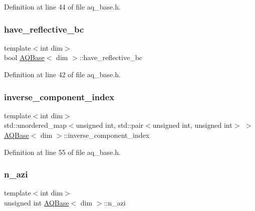 Definition at line 44 of file aq\+\_\+base.\+h.

\mbox{\label{class_a_q_base_a8afa1e0da5bbb4846e495178e165b5b5}} 
\subsubsection{\texorpdfstring{have\+\_\+reflective\+\_\+bc}{have\_reflective\_bc}}
{\footnotesize\ttfamily template$<$int dim$>$ \\
bool \hyperlink{class_a_q_base}{A\+Q\+Base}$<$ dim $>$\+::have\+\_\+reflective\+\_\+bc\hspace{0.3cm}{\ttfamily [protected]}}



Definition at line 42 of file aq\+\_\+base.\+h.

\mbox{\label{class_a_q_base_a657640cc73cef6130bdf5b325dd0fd11}} 
\subsubsection{\texorpdfstring{inverse\+\_\+component\+\_\+index}{inverse\_component\_index}}
{\footnotesize\ttfamily template$<$int dim$>$ \\
std\+::unordered\+\_\+map$<$unsigned int, std\+::pair$<$unsigned int, unsigned int$>$ $>$ \hyperlink{class_a_q_base}{A\+Q\+Base}$<$ dim $>$\+::inverse\+\_\+component\+\_\+index\hspace{0.3cm}{\ttfamily [protected]}}



Definition at line 55 of file aq\+\_\+base.\+h.

\mbox{\label{class_a_q_base_aaff6bd848436445d267c1a121a93e4ea}} 
\subsubsection{\texorpdfstring{n\+\_\+azi}{n\_azi}}
{\footnotesize\ttfamily template$<$int dim$>$ \\
unsigned int \hyperlink{class_a_q_base}{A\+Q\+Base}$<$ dim $>$\+::n\+\_\+azi\hspace{0.3cm}{\ttfamily [protected]}}



